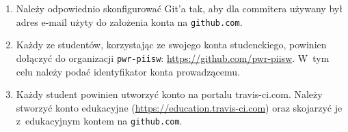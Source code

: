 \documentclass[12pt]{article}
\begin{document}
\begin{enumerate}
        \item Należy odpowiednio skonfigurować Git’a tak, aby dla commitera używany był adres e-mail użyty do założenia konta na \texttt{github.com}.

        \item Każdy ze studentów, korzystając ze swojego konta studenckiego, powinien dołączyć do organizacji \texttt{pwr-piisw}: \url{https://github.com/pwr-piisw}. W~tym celu należy podać identyfikator konta prowadzącemu.

        \item Każdy student powinien utworzyć konto na portalu travis-ci.com. Należy stworzyć konto edukacyjne (\url{https://education.travis-ci.com}) oraz skojarzyć je z~edukacyjnym kontem na \texttt{github.com}.
    \end{enumerate}
\end{document}
